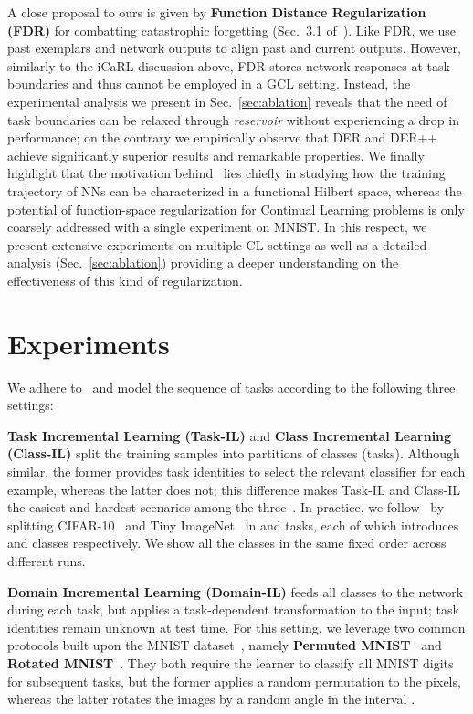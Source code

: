\documentclass{article}
\begin{document}
A close proposal to ours is given by \textbf{Function Distance Regularization (FDR)} for combatting catastrophic forgetting (Sec.~3.1 of~\cite{benjamin2018measuring}). Like FDR, we use past exemplars and network outputs to align past and current outputs. However, similarly to the iCaRL discussion above, FDR stores network responses at task boundaries and thus cannot be employed in a GCL setting. Instead, the experimental analysis we present in Sec.~\ref{sec:ablation} reveals that the need of task boundaries can be relaxed through \textit{reservoir} without experiencing a drop in performance; on the contrary we empirically observe that DER and DER++ achieve significantly superior results and remarkable properties. We finally highlight that the motivation behind~\cite{benjamin2018measuring} lies chiefly in studying how the training trajectory of NNs can be characterized in a functional  Hilbert space, whereas the potential of function-space regularization for Continual Learning problems is only coarsely addressed with a single experiment on MNIST. In this respect, we present extensive experiments on multiple CL settings as well as a detailed analysis (Sec.~\ref{sec:ablation}) providing a deeper understanding on the effectiveness of this kind of regularization.
 \section{Experiments}
\label{sec:experiments}
We adhere to~\cite{hsu2018re,van2019three} and model the sequence of tasks according to the following three settings: 

\textbf{Task Incremental Learning (Task-IL)} and \textbf{Class Incremental Learning (Class-IL)} split the training samples into partitions of classes (tasks). Although similar, the former provides task identities to select the relevant classifier for each example, whereas the latter does not; this difference makes Task-IL and Class-IL the easiest and hardest scenarios among the three~\cite{van2019three}. In practice, we follow~\cite{de2019continual, zenke2017continual} by splitting CIFAR-10~\cite{krizhevsky2009learning} and Tiny ImageNet~\cite{tinyimgnet} in  and  tasks, each of which introduces  and  classes respectively. We show all the classes in the same fixed order across different runs. 

\textbf{Domain Incremental Learning (Domain-IL)} feeds all classes to the network during each task, but applies a task-dependent transformation to the input; task identities remain unknown at test time. For this setting, we leverage two common protocols built upon the MNIST dataset~\cite{lecun1998gradient}, namely \textbf{Permuted MNIST}~\cite{kirkpatrick2017overcoming} and \textbf{Rotated MNIST}~\cite{lopez2017gradient}. They both require the learner to classify all MNIST digits for  subsequent tasks, but the former applies a random permutation to the pixels, whereas the latter rotates the images by a random angle in the interval .
\end{document}
